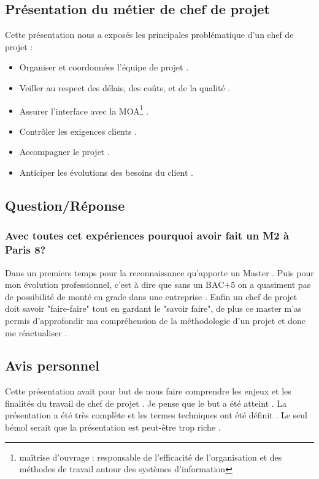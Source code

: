  	\subsection{Présentation du métier de chef de projet } 
 	Cette présentation nous a exposés les principales problématique d'un chef de projet :
 		\begin{itemize}
 	  	\item Organiser et coordonnées l’équipe de projet .
 	  	\item Veiller au respect des délais, des coûts, et de la qualité .
 	  	\item Assurer l'interface avec la MOA\footnote{maîtrise d'ouvrage :  responsable de l’efficacité de l'organisation et des méthodes de travail autour des systèmes d'information} .
 	  	\item Contrôler les exigences clients .
 	  	\item Accompagner le projet .
 	  	\item Anticiper les évolutions des besoins du client .  
 	  	\end{itemize}  

 	\subsection{Question/Réponse}
 		\subsubsection{Avec toutes cet expériences pourquoi avoir fait un M2 à Paris 8?} 
 		\label{ssub:avec_toutes_cet_experiences_pourquoi_avoir_fait_un_m2}
 		Dans un premiers temps pour la reconnaissance qu'apporte un Master . Puis pour mon évolution professionnel, c'est à dire que sans un BAC+5 on a quasiment pas de possibilité de monté en grade dans une entreprise . Enfin un chef de projet doit savoir "faire-faire" tout en gardant le "savoir faire", de plus ce master m'as permis d'approfondir ma compréhension de la méthodologie d'un projet et donc me réactualiser .

 	\subsection{Avis personnel} 
 	Cette présentation avait pour but de nous faire comprendre les enjeux et les finalités du travail de chef de projet . Je pense que le but a été atteint . La présentation a été très complète et les termes techniques ont été définit . Le seul bémol serait que la présentation est peut-être trop riche .